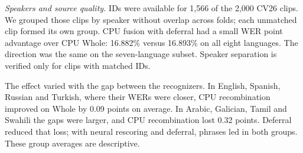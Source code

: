 \documentclass[conference,letterpaper]{IEEEtran}
\begin{document}
\emph{Speakers and source quality.} IDs were available for 1,566 of the 2,000 CV26 clips. We grouped those clips by speaker without overlap across folds; each unmatched clip formed its own group. CPU fusion with deferral had a small WER point advantage over CPU Whole: 16.882\% versus 16.893\% on all eight languages. The direction was the same on the seven-language subset. Speaker separation is verified only for clips with matched IDs.

The effect varied with the gap between the recognizers. In English, Spanish, Russian and Turkish, where their WERs were closer, CPU recombination improved on Whole by 0.09 points on average. In Arabic, Galician, Tamil and Swahili the gaps were larger, and CPU recombination lost 0.32 points. Deferral reduced that loss; with neural rescoring and deferral, phrases led in both groups. These group averages are descriptive.
\end{document}
